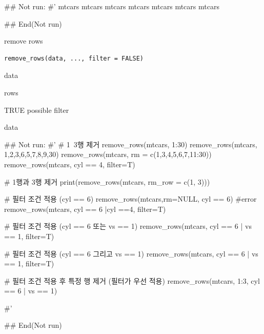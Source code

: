 \documentclass[a4paper]{book}
\begin{document}
%
\begin{Examples}
\begin{ExampleCode}

\#\# Not run: 
#'
mtcars %
mtcars %
mtcars %
mtcars %
mtcars %
mtcars %
mtcars %

## End(Not run)

\end{ExampleCode}
\end{Examples}
%
\begin{Description}
remove rows
\end{Description}
%
\begin{Usage}
\begin{verbatim}
remove_rows(data, ..., filter = FALSE)
\end{verbatim}
\end{Usage}
%
\begin{Arguments}
\begin{ldescription}
\item[\code{data}] data

\item[\code{...}] rows

\item[\code{filter}] TRUE possible filter
\end{ldescription}
\end{Arguments}
%
\begin{Value}
data
\end{Value}
%
\begin{Examples}
\begin{ExampleCode}

\#\# Not run: 
#'
# 1~3행 제거
remove_rows(mtcars,  1:30)
remove_rows(mtcars, 1,2,3,6,5,7,8,9,30)
remove_rows(mtcars, rm = c(1,3,4,5,6,7,11:30))
remove_rows(mtcars, cyl == 4, filter=T)

# 1행과 3행 제거
print(remove_rows(mtcars, rm_row = c(1, 3)))

# 필터 조건 적용 (cyl == 6)
remove_rows(mtcars,rm=NULL, cyl == 6) #error
remove_rows(mtcars, cyl == 6 |cyl ==4, filter=T)

# 필터 조건 적용 (cyl == 6 또는 vs == 1)
remove_rows(mtcars, cyl == 6 | vs == 1, filter=T)

# 필터 조건 적용 (cyl == 6 그리고 vs == 1)
remove_rows(mtcars, cyl == 6 | vs == 1, filter=T)

# 필터 조건 적용 후 특정 행 제거 (필터가 우선 적용)
remove_rows(mtcars, 1:3, cyl == 6 | vs == 1)

#'

## End(Not run)


\end{ExampleCode}
\end{Examples}
\end{document}

